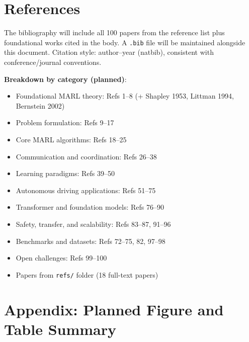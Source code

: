 \documentclass[12pt, a4paper]{article}
\begin{document}
\section*{References}

\begin{outline_note}
The bibliography will include all 100 papers from the reference list
plus foundational works cited in the body.  A \texttt{.bib} file
will be maintained alongside this document.  Citation style:
author--year (natbib), consistent with conference/journal conventions.

\textbf{Breakdown by category (planned)}:
\begin{itemize}[nosep]
  \item Foundational MARL theory: Refs 1--8 (+ Shapley 1953, Littman 1994, Bernstein 2002)
  \item Problem formulation: Refs 9--17
  \item Core MARL algorithms: Refs 18--25
  \item Communication and coordination: Refs 26--38
  \item Learning paradigms: Refs 39--50
  \item Autonomous driving applications: Refs 51--75
  \item Transformer and foundation models: Refs 76--90
  \item Safety, transfer, and scalability: Refs 83--87, 91--96
  \item Benchmarks and datasets: Refs 72--75, 82, 97--98
  \item Open challenges: Refs 99--100
  \item Papers from \texttt{refs/} folder (18 full-text papers)
\end{itemize}
\end{outline_note}

\newpage
\appendix

\section*{Appendix: Planned Figure and Table Summary}
\end{document}
